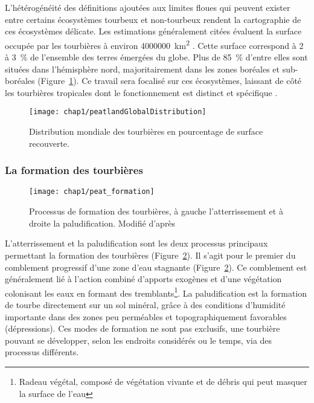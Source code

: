L'hétérogénéité des définitions ajoutées aux limites floues qui peuvent exister entre certains écosystèmes tourbeux et non-tourbeux rendent la cartographie de ces écosystèmes délicate.
Les estimations généralement citées évaluent la surface occupée par les tourbières à environ \SI{4000000}{\square\kilo\meter} \citep{lappalainen1996}. 
Cette surface correspond à \num{2} à \SI{3}{\percent} de l'ensemble des terres émergées du globe.
Plus de \SI{85}{\percent} d'entre elles sont situées dans l'hémisphère nord, majoritairement dans les zones boréales et sub-boréales \citep{strack2008} (Figure~\ref{fig:peatlandGlobalDistribution}).
Ce travail sera focalisé sur ces écosystèmes, laissant de côté les tourbières tropicales dont le fonctionnement est distinct et spécifique \plop.

\begin{figure}
\centering
\texttt{[image: chap1/peatlandGlobalDistribution]}
\caption{Distribution mondiale des tourbières en pourcentage de surface recouverte.}
\label{fig:peatlandGlobalDistribution} 
\end{figure}

\subsubsection{La formation des tourbières}

\begin{figure}
\centering
\texttt{[image: chap1/peat\_formation]}
\caption{Processus de formation des tourbières, à gauche l'atterrissement et à droite la paludification. Modifié d'après \citet{manneville1999}}
\label{fig:peat_formation}
\end{figure}

L'atterrissement et la paludification sont les deux processus principaux permettant la formation des tourbières (Figure~\ref{fig:peat_formation}).
Il s'agit pour le premier du comblement progressif d'une zone d'eau stagnante (Figure~\ref{fig:peat_formation}).
Ce comblement est généralement lié à l'action combiné d'apports exogènes et d'une végétation colonisant les eaux en formant des tremblants\footnote{Radeau végétal, composé de végétation vivante et de débris qui peut masquer la surface de l'eau}.
La paludification est la formation de tourbe directement sur un sol minéral, grâce à des conditions d'humidité importante dans des zones peu perméables et topographiquement favorables (dépressions).
Ces modes de formation ne sont pas exclusifs, une tourbière pouvant se développer, selon les endroits considérés ou le temps, via des processus différents.

